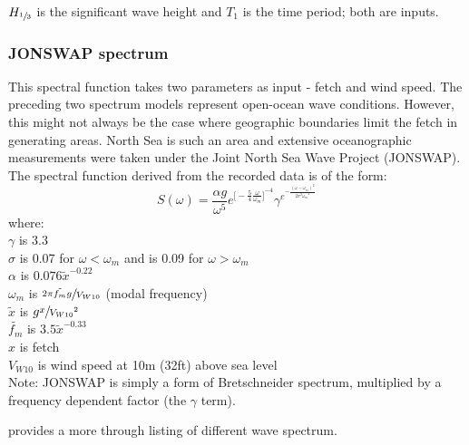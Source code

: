 $H_{\sfrac{1}{3}}$ is the significant wave height and $T_1$ is the time period;
both are inputs.

\subsubsection{JONSWAP spectrum} \label{JONSWAP spectrum}
This spectral function takes two parameters as input - fetch and wind speed. The 
preceding two spectrum models represent open-ocean wave conditions. However, 
this might not always be the case where geographic boundaries limit the fetch in
generating areas. North Sea is such an area and extensive oceanographic
measurements were taken under the Joint North Sea Wave Project (JONSWAP). The
spectral function derived from the recorded data is of the form: 
\begin{equation}
  S(\omega) = \frac{\alpha g}{\omega^{5}} 
  e^{
    {
    \big[ 
      -\frac{5}{4} \frac{\omega}{\omega_m} 
    \big]
    }^{-4}
  }
  \gamma^{
    e^{
        -\frac{(\omega -\omega_m)^2}{2 \sigma^2 {\omega_m}^2}
      }
    }
  \label {eq: JONSWAP spectrum}
\end{equation}
where:\\
$\gamma$ is 3.3\\
$\sigma$ is 0.07 for $\omega < \omega_m$ and is 0.09 for $\omega > \omega_m$\\
$\alpha$ is $0.076 {\tilde{x}}^{-0.22}$\\
$\omega_m $ is $ \sfrac{2 \pi \tilde{f_m} g}{V_{W10}}$ (modal frequency)\\
$\tilde{x}$ is $g \sfrac{x}{{V_{W10}}^2}$\\
$\tilde{f_m}$ is $3.5 {\tilde{x}}^{-0.33}$ \\
$x$ is fetch \\
$V_{W10}$ is wind speed at 10m (32ft) above sea level\\

Note: JONSWAP is simply a form of Bretschneider spectrum, multiplied by a
frequency dependent factor (the $\gamma$ term).

\cite{stansberg2002specialist} provides a more through listing of different wave
spectrum.

